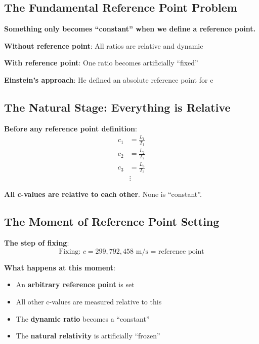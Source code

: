 	\subsection{The Fundamental Reference Point Problem}
	
	\begin{tcolorbox}[colback=red!5!white,colframe=red!75!black,title=Reference Point and Constancy]
		\textbf{Something only becomes ``constant'' when we define a reference point.}
		
		\textbf{Without reference point}: All ratios are relative and dynamic
		
		\textbf{With reference point}: One ratio becomes artificially ``fixed''
		
		\textbf{Einstein's approach}: He defined an absolute reference point for c
	\end{tcolorbox}
	
	\subsection{The Natural Stage: Everything is Relative}
	
	\textbf{Before any reference point definition}:
	\begin{align}
		c_1 &= \frac{L_1}{T_1} \\
		c_2 &= \frac{L_2}{T_2} \\
		c_3 &= \frac{L_3}{T_3} \\
		&\vdots
	\end{align}
	
	\textbf{All c-values are relative to each other}. None is ``constant''.
	
	\subsection{The Moment of Reference Point Setting}
	
	\textbf{The step of fixing}:
	\begin{equation}
		\text{Fixing: } c = 299,792,458 \text{ m/s = reference point}
	\end{equation}
	
	\textbf{What happens at this moment}:
	\begin{itemize}
		\item An \textbf{arbitrary reference point} is set
		\item All other c-values are measured relative to this
		\item The \textbf{dynamic ratio} becomes a ``constant''
		\item The \textbf{natural relativity} is artificially ``frozen''
	\end{itemize}
	
